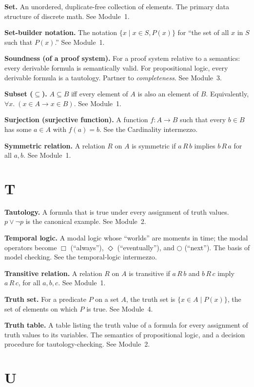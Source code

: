 \documentclass[11pt]{article}
\begin{document}
\textbf{Set.} An unordered, duplicate-free collection of elements. The primary data structure of discrete math. See Module~1.

\textbf{Set-builder notation.} The notation $\{x \mid x \in S, P(x)\}$ for ``the set of all $x$ in $S$ such that $P(x)$.'' See Module~1.

\textbf{Soundness (of a proof system).} For a proof system relative to a semantics: every derivable formula is semantically valid. For propositional logic, every derivable formula is a tautology. Partner to \emph{completeness}. See Module~3.

\textbf{Subset ($\subseteq$).} $A \subseteq B$ iff every element of $A$ is also an element of $B$. Equivalently, $\forall x.\; (x \in A \to x \in B)$. See Module~1.

\textbf{Surjection (surjective function).} A function $f : A \to B$ such that every $b \in B$ has some $a \in A$ with $f(a) = b$. See the Cardinality intermezzo.

\textbf{Symmetric relation.} A relation $R$ on $A$ is symmetric if $a \, R \, b$ implies $b \, R \, a$ for all $a, b$. See Module~1.

\section*{T}

\textbf{Tautology.} A formula that is true under every assignment of truth values. $p \vee \lnot p$ is the canonical example. See Module~2.

\textbf{Temporal logic.} A modal logic whose ``worlds'' are moments in time; the modal operators become $\Box$ (``always''), $\Diamond$ (``eventually''), and $\bigcirc$ (``next''). The basis of model checking. See the temporal-logic intermezzo.

\textbf{Transitive relation.} A relation $R$ on $A$ is transitive if $a \, R \, b$ and $b \, R \, c$ imply $a \, R \, c$, for all $a, b, c$. See Module~1.

\textbf{Truth set.} For a predicate $P$ on a set $A$, the truth set is $\{x \in A \mid P(x)\}$, the set of elements on which $P$ is true. See Module~4.

\textbf{Truth table.} A table listing the truth value of a formula for every assignment of truth values to its variables. The semantics of propositional logic, and a decision procedure for tautology-checking. See Module~2.

\section*{U}
\end{document}
